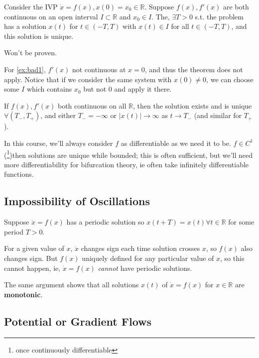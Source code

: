 \documentclass[12pt, oneside]{article}
\begin{document}
\begin{theorem}
  Consider the IVP $\dot{x}= f(x), x(0) = x_0 \in \mathbb{R}$. Suppose $f(x), f'(x)$ are both continuous on an open interval $I \subset \mathbb{R}$ and $x_0 \in I$. The, $\exists T > 0$ s.t. the problem has a solution $x(t)$ for $t \in (-T, T)$ with $x(t) \in I$ for all $t \in (-T,T)$, and this solution is unique.
\end{theorem}

\begin{remark}
  Won't be proven.
\end{remark}

\begin{remark}
  For \cref{ex:bad1}, $f'(x)$ not continuous at $x = 0$, and thus the theorem does not apply. Notice that if we consider the same system with $x(0) \neq 0$, we can choose some $I$ which contains $x_0$ but not $0$ and apply it there.
\end{remark}

\begin{corollary}
  If $f(x), f'(x)$ both continuous on all $\mathbb{R}$, then the solution exists and is unique $\forall (T_-, T_+)$, and either $T_- = - \infty$ or $|x(t)| \to \infty$ as $t \to T_-$ (and similar for $T_+$).
\end{corollary}

In this course, we'll always consider $f$ as differentiable as we need it to be. $f \in C^1$ (\footnote{once continuously differentiable})then solutions are unique while bounded; this is often sufficient, but we'll need more differentiability for bifurcation theory, ie often take infinitely differentiable functions.

\subsection{Impossibility of Oscillations}

Suppose $\dot{x} = f(x)$ has a periodic solution so $x(t+T) = x(t) \forall t \in \mathbb{R}$ for some period $T > 0$.

For a given value of $x$, $\dot{x}$ changes sign each time solution crosses $x$, so $f(x)$ also changes sign. But $f(x)$ uniquely defined for any particular value of $x$, so this cannot happen, ie, $\dot{x} = f(x)$ \textit{cannot} have periodic solutions.

The same argument shows that all solutions $x(t)$ of $\dot{x} = f(x)$ for $x \in \mathbb{R}$ are \textbf{monotonic}.

\subsection{Potential or Gradient Flows}
\end{document}
